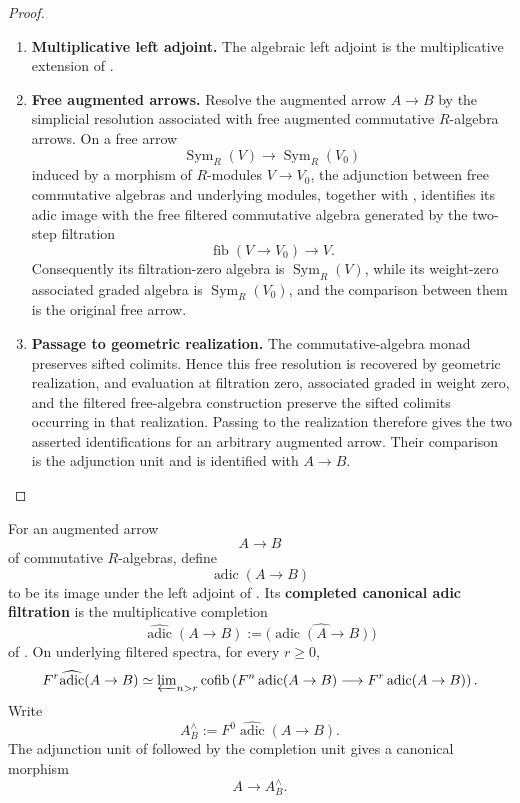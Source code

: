 \begin{proof}
\leavevmode
\begin{enumerate}[label=\textup{(\arabic*)}]
    \item \textbf{Multiplicative left adjoint.}
    The algebraic left adjoint is the multiplicative extension of
    .
    \item \textbf{Free augmented arrows.}
    Resolve the augmented arrow \(A\to B\) by the simplicial resolution associated with
    free augmented commutative \(R\)-algebra arrows. On a free arrow
    \[
        \operatorname{Sym}_R(V)
        \longrightarrow
        \operatorname{Sym}_R(V_0)
    \]
    induced by a morphism of \(R\)-modules \(V\to V_0\), the adjunction between
    free commutative algebras and underlying modules, together with
    , identifies its adic image with
    the free filtered commutative algebra generated by the two-step filtration
    \[
        \operatorname{fib}(V\to V_0)\longrightarrow V.
    \]
    Consequently its filtration-zero algebra is \(\operatorname{Sym}_R(V)\), while
    its weight-zero associated graded algebra is \(\operatorname{Sym}_R(V_0)\), and
    the comparison between them is the original free arrow.
    \item \textbf{Passage to geometric realization.}
    The commutative-algebra monad preserves sifted colimits. Hence this
    free resolution is recovered by geometric realization, and evaluation at
    filtration zero, associated graded in weight zero, and the filtered free-algebra
    construction preserve the sifted colimits occurring in that realization.
    Passing to the realization therefore gives the two asserted identifications for
    an arbitrary augmented arrow. Their comparison is the adjunction unit and is
    identified with \(A\to B\).
\end{enumerate}
\end{proof}

\begin{definition}
\label{def:canonical-adic-filtration}
For an augmented arrow
\[
    A\longrightarrow B
\]
of commutative \(R\)-algebras, define
\[
    \operatorname{adic}(A\to B)
\]
to be its image under the left adjoint of
. Its \textbf{completed canonical adic
filtration} is the multiplicative completion
\[
    \widehat{\operatorname{adic}}(A\to B)
    :=
    \widehat{\bigl(\operatorname{adic}(A\to B)\bigr)}
\]
of . On underlying filtered spectra,
for every \(r\geq0\),
\[
    F^r\widehat{\operatorname{adic}}(A\to B)
    \simeq
    \varprojlim\nolimits_{n>r}
    \operatorname{cofib}
    \left(
        F^n\operatorname{adic}(A\to B)
        \longrightarrow
        F^r\operatorname{adic}(A\to B)
    \right).
\]
Write
\[
    A^{\wedge}_B
    :=
    F^0\widehat{\operatorname{adic}}(A\to B).
\]
The adjunction unit of  followed by the
completion unit gives a canonical morphism
\[
    A\longrightarrow A^{\wedge}_B.
\]
\end{definition}

